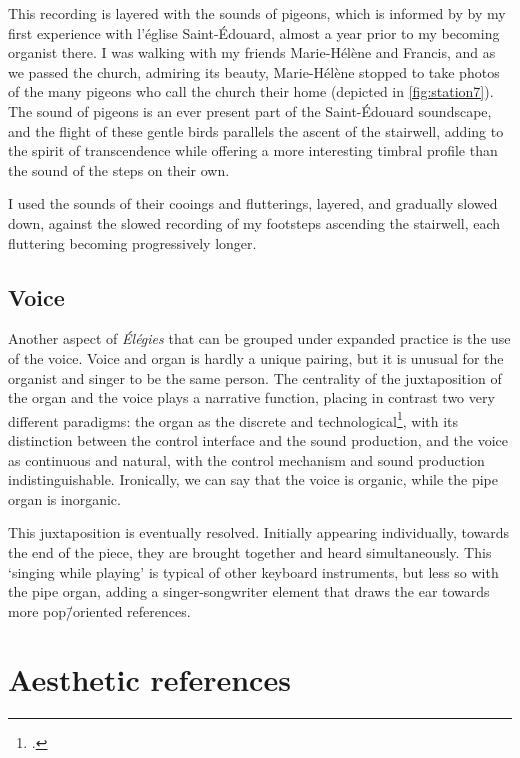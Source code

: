 \documentclass[12pt,twoside,maitrise]{dms_ks}
\theoremstyle{definition}
\begin{document}
{This recording is layered with the sounds of pigeons, which is informed by by my first experience with l'église Saint-Édouard, almost a year prior to my becoming organist there. 
I was walking with my friends Marie-Hélène and Francis, and as we passed the church, admiring its beauty, Marie-Hélène stopped to take photos of the many pigeons who call the church their home (depicted in \cref{fig:station7}). 
The sound of pigeons is an ever present part of the Saint-Édouard soundscape, and the flight of these gentle birds parallels the ascent of the stairwell, adding to the spirit of transcendence while offering a more interesting timbral profile than the sound of the steps on their own. 

I used the sounds of their cooings and flutterings, layered, and gradually slowed down, against the slowed recording of my footsteps ascending the stairwell, each fluttering becoming progressively longer.

\subsection{Voice}

Another aspect of \textit{Élégies} that can be grouped under expanded practice is the use of the voice. 
Voice and organ is hardly a unique pairing, but it is unusual for the organist and singer to be the same person.
The centrality of the juxtaposition of the organ and the voice plays a narrative function, placing in contrast two very different paradigms: the organ as the discrete and technological\footcite[This position is echoed by Bela Bartok's classification of the pipe organ as being more mechanical and less human.][24]{jorda_digital_2005}, with its distinction between the control interface and the sound production, and the voice as continuous and natural, with the control mechanism and sound production indistinguishable. 
Ironically, we can say that the voice is organic, while the pipe organ is inorganic.
 
This juxtaposition is eventually resolved.
Initially appearing individually, towards the end of the piece, they are brought together and heard simultaneously.
This `singing while playing' is typical of other keyboard instruments, but less so with the pipe organ, adding a singer-songwriter element that draws the ear towards more pop\=/oriented references.


\section{Aesthetic references}

}
\end{document}
